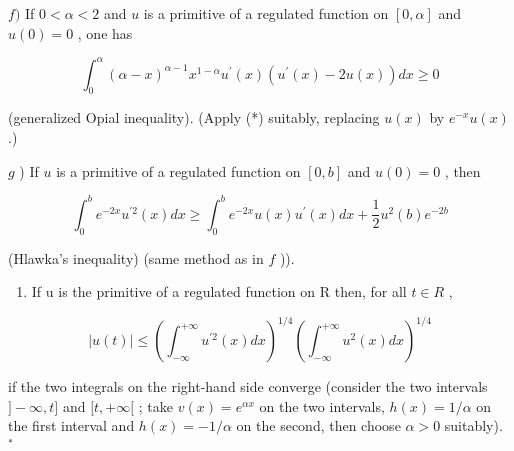 \(f)\) If \(0 < \alpha < 2\) and \(u\) is a primitive of a regulated function on \([0, \alpha]\) and \(u(0) = 0\) , one has

\[
\int_ {0} ^ {\alpha} (\alpha - x) ^ {\alpha - 1} x ^ {1 - \alpha} u ^ {\prime} (x) \left(u ^ {\prime} (x) - 2 u (x)\right) d x \geqslant 0
\]

(generalized Opial inequality). (Apply (*) suitably, replacing \(u(x)\) by \(e^{-x}u(x)\) .)

\(g\) ) If \(u\) is a primitive of a regulated function on \([0,b]\) and \(u(0) = 0\) , then

\[
\int_ {0} ^ {b} e ^ {- 2 x} u ^ {\prime 2} (x) d x \geqslant \int_ {0} ^ {b} e ^ {- 2 x} u (x) u ^ {\prime} (x) d x + \frac {1}{2} u ^ {2} (b) e ^ {- 2 b}
\]

(Hlawka's inequality) (same method as in \(f\) )).

\begin{enumerate}
\def\labelenumi{\alph{enumi})}
\setcounter{enumi}{7}
\tightlist
\item
  If u is the primitive of a regulated function on R then, for all \(t \in R\) ,
\end{enumerate}

\[
| u (t) | \leqslant \left(\int_ {- \infty} ^ {+ \infty} u ^ {\prime 2} (x) d x\right) ^ {1 / 4} \left(\int_ {- \infty} ^ {+ \infty} u ^ {2} (x) d x\right) ^ {1 / 4}
\]

if the two integrals on the right-hand side converge (consider the two intervals \(]-\infty,t]\) and \([t,+\infty[\) ; take \(v(x)=e^{\alpha x}\) on the two intervals, \(h(x)=1/\alpha\) on the first interval and \(h(x)=-1/\alpha\) on the second, then choose \(\alpha>0\) suitably). \(^{*}\)

